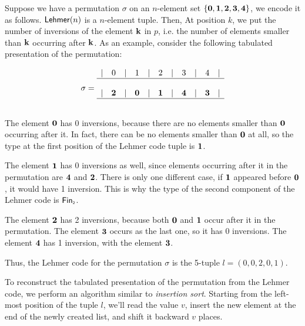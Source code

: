 
Suppose we have a permutation $\sigma$ on an $n$-element set $\{\mathbf{0}, \mathbf{1}, \mathbf{2}, \mathbf{3}, \mathbf{4}\}$, we encode it
as follows. $\Lehmer[n]$ is a $n$-element tuple. Then, At position $k$, we put the number of inversions of the element
$\mathbf{k}$ in $p$, i.e. the number of elements smaller than $\mathbf{k}$ occurring after $\mathbf{k}$. As an example, consider the
following tabulated presentation of the permutation:


\[
  \sigma =
  \begin{array}{ccccccccccccccc}
    | & 0      & | & 1      & | & 2      & | & 3      & | & 4      & | \\
    \hline                                                             \\
    | & \mathbf{2} & | & \mathbf{0} & | & \mathbf{1} & | & \mathbf{4} & | & \mathbf{3} & | \\
    \hline                                                             \\
  \end{array}
\]


The element $\mathbf{0}$ has 0 inversions, because there are no elements smaller than $\mathbf{0}$ occurring after it. In fact,
there can be no elements smaller than $\mathbf{0}$ at all, so the type at the first position of the Lehmer code tuple is
${\mathbf{1}}$.

The element $\mathbf{1}$ has 0 inversions as well, since elements occurring after it in the permutation are $\mathbf{4}$ and
$\mathbf{2}$. There is only one different case, if $\mathbf{1}$ appeared before $\mathbf{0}$, it would have 1 inversion. This is why
the type of the second component of the Lehmer code is $\Fin[2]$.

The element $\mathbf{2}$ has 2 inversions, because both $\mathbf{0}$ and $\mathbf{1}$ occur after it in the permutation. The element
$\mathbf{3}$ occurs as the last one, so it has 0 inversions. The element $\mathbf{4}$ has 1 inversion, with the element
$\mathbf{3}$.

Thus, the Lehmer code for the permutation $\sigma$ is the 5-tuple $l = (0, 0, 2, 0, 1)$.

To reconstruct the tabulated presentation of the permutation from the Lehmer code, we perform an algorithm similar to
\emph{insertion sort}. Starting from the left-most position of the tuple $l$, we'll read the value $v$, insert the new
element at the end of the newly created list, and shift it backward $v$ places.

